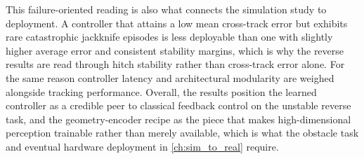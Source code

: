 This failure-oriented reading is also what connects the simulation study to deployment. A controller that attains a low mean cross-track error but exhibits rare catastrophic jackknife episodes is less deployable than one with slightly higher average error and consistent stability margins, which is why the reverse results are read through hitch stability rather than cross-track error alone. For the same reason controller latency and architectural modularity are weighed alongside tracking performance. Overall, the results position the learned controller as a credible peer to classical feedback control on the unstable reverse task, and the geometry-encoder recipe as the piece that makes high-dimensional perception trainable rather than merely available, which is what the obstacle task and eventual hardware deployment in \cref{ch:sim_to_real} require.
